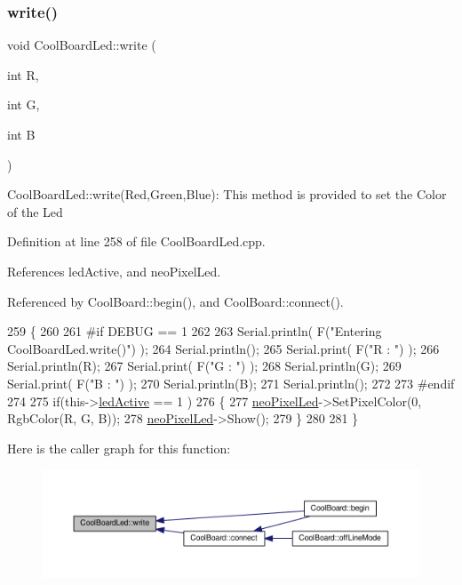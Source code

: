 \subsubsection{\texorpdfstring{write()}{write()}}
{\footnotesize\ttfamily void Cool\+Board\+Led\+::write (\begin{DoxyParamCaption}\item[{int}]{R,  }\item[{int}]{G,  }\item[{int}]{B }\end{DoxyParamCaption})}

Cool\+Board\+Led\+::write(\+Red,\+Green,\+Blue)\+: This method is provided to set the Color of the Led 

Definition at line 258 of file Cool\+Board\+Led.\+cpp.



References led\+Active, and neo\+Pixel\+Led.



Referenced by Cool\+Board\+::begin(), and Cool\+Board\+::connect().


\begin{DoxyCode}
259 \{
260 
261 \textcolor{preprocessor}{#if DEBUG == 1}
262 
263     Serial.println( F(\textcolor{stringliteral}{"Entering CoolBoardLed.write()"}) );
264     Serial.println();
265     Serial.print( F(\textcolor{stringliteral}{"R : "}) );
266     Serial.println(R);
267     Serial.print( F(\textcolor{stringliteral}{"G : "}) );
268     Serial.println(G);
269     Serial.print( F(\textcolor{stringliteral}{"B : "}) );
270     Serial.println(B);
271     Serial.println();   
272 
273 \textcolor{preprocessor}{#endif}
274 
275     \textcolor{keywordflow}{if}(this->\hyperlink{classCoolBoardLed_a5f17c135516fcf4b44ea8a096ba0177a}{ledActive} == 1 )
276     \{
277         \hyperlink{classCoolBoardLed_ac2c13fa462a010cd9242bf297c013923}{neoPixelLed}->SetPixelColor(0, RgbColor(R, G, B));
278         \hyperlink{classCoolBoardLed_ac2c13fa462a010cd9242bf297c013923}{neoPixelLed}->Show();
279     \}
280 
281 \}
\end{DoxyCode}
Here is the caller graph for this function\+:
\nopagebreak
\begin{figure}[H]
\begin{center}
\leavevmode
\includegraphics[width=350pt]{classCoolBoardLed_a30fadd4cbec17ceea428bf7a32207e87_icgraph}
\end{center}
\end{figure}


